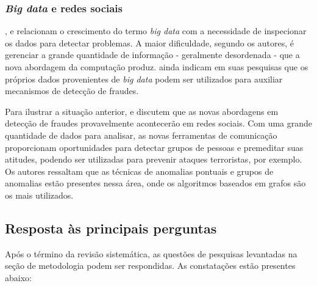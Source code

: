 \documentclass[smallextended]{svjour3}
\begin{document}
\subsubsection{\emph{Big data} e redes sociais}

\cite{Feily2009}, \cite{Mahmood2013} e \cite{Sharma2015} relacionam o crescimento do termo \emph{big data} com a necessidade de inspecionar os dados para detectar problemas. A maior dificuldade, segundo os autores, é gerenciar a grande quantidade de informação - geralmente desordenada - que a nova abordagem da computação produz. \cite{Sharma2015} ainda indicam em suas pesquisas que os próprios dados provenientes de \emph{big data} podem ser utilizados para auxiliar mecanismos de detecção de fraudes.     

Para ilustrar a situação anterior, \cite{Liu2015} e \cite{Yu2016} discutem que as novas abordagens em detecção de fraudes provavelmente acontecerão em redes sociais. Com uma grande quantidade de dados para analisar, as novas ferramentas de comunicação proporcionam oportunidades para detectar grupos de pessoas e premeditar suas atitudes, podendo ser utilizadas para prevenir ataques terroristas, por exemplo. Os autores ressaltam que as técnicas de anomalias pontuais e grupos de anomalias estão presentes nessa área, onde os algoritmos baseados em grafos são os mais utilizados.


\subsection{Resposta às principais perguntas}

Após o término da revisão sistemática, as questões de pesquisas levantadas na seção de metodologia podem ser respondidas. As constatações estão presentes abaixo:
\end{document}
